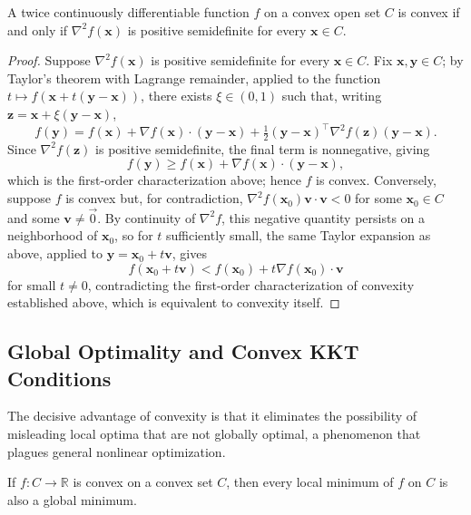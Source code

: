 \begin{theorem}
A twice continuously differentiable function $f$ on a convex open set $C$ is convex if and only if $\nabla^2 f(\mathbf{x})$ is positive semidefinite for every $\mathbf{x} \in C$.
\end{theorem}

\begin{proof}
Suppose $\nabla^2 f(\mathbf{x})$ is positive semidefinite for every $\mathbf{x} \in C$. Fix $\mathbf{x}, \mathbf{y} \in C$; by Taylor's theorem with Lagrange remainder, applied to the function $t \mapsto f(\mathbf{x}+t(\mathbf{y}-\mathbf{x}))$, there exists $\xi \in (0,1)$ such that, writing $\mathbf{z} = \mathbf{x}+\xi(\mathbf{y}-\mathbf{x})$,
\[
f(\mathbf{y}) = f(\mathbf{x}) + \nabla f(\mathbf{x}) \cdot (\mathbf{y}-\mathbf{x}) + \tfrac{1}{2}(\mathbf{y}-\mathbf{x})^{\top} \nabla^2 f(\mathbf{z}) (\mathbf{y}-\mathbf{x}).
\]
Since $\nabla^2 f(\mathbf{z})$ is positive semidefinite, the final term is nonnegative, giving
\[
f(\mathbf{y}) \geq f(\mathbf{x}) + \nabla f(\mathbf{x})\cdot(\mathbf{y}-\mathbf{x}),
\] which is the first-order characterization above; hence $f$ is convex. Conversely, suppose $f$ is convex but, for contradiction, $\nabla^2 f(\mathbf{x}_0)\mathbf{v} \cdot \mathbf{v} < 0$ for some $\mathbf{x}_0 \in C$ and some $\mathbf{v} \neq \vec{0}$. By continuity of $\nabla^2 f$, this negative quantity persists on a neighborhood of $\mathbf{x}_0$, so for $t$ sufficiently small, the same Taylor expansion as above, applied to $\mathbf{y} = \mathbf{x}_0+t\mathbf{v}$, gives
\[
f(\mathbf{x}_0+t\mathbf{v}) < f(\mathbf{x}_0) + t\nabla f(\mathbf{x}_0)\cdot \mathbf{v}
\]
 for small $t \neq 0$, contradicting the first-order characterization of convexity established above, which is equivalent to convexity itself.
\end{proof}

\subsection{Global Optimality and Convex KKT Conditions}

The decisive advantage of convexity is that it eliminates the possibility of misleading local optima that are not globally optimal, a phenomenon that plagues general nonlinear optimization.

\begin{theorem}
If $f : C \to \mathbb{R}$ is convex on a convex set $C$, then every local minimum of $f$ on $C$ is also a global minimum.
\end{theorem}

